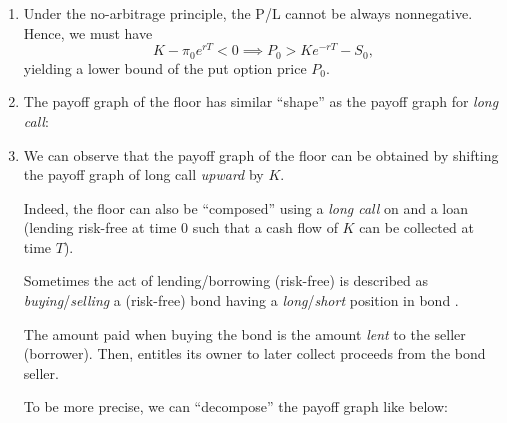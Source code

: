 \begin{enumerate}
\item \label{it:put-price-lb}
Under the no-arbitrage principle, the P/L cannot be always nonnegative. Hence,
we must have
\[
K-\pi_0 e^{rT}<0 \implies P_0>Ke^{-rT}-S_0,
\]
yielding a lower bound of the put option price \(P_0\).
\item The payoff graph of the floor has similar ``shape'' as the payoff graph
for \emph{long call}:
\begin{center}
\end{center}

\item \label{it:floor-lc-lb-payoff}
We can observe that the payoff graph of the floor can be obtained by
shifting the payoff graph of long call \emph{upward} by \(K\).

Indeed, the floor can also be ``composed'' using a \emph{long call} on
 and a loan (lending  risk-free at time
0 such that a cash flow of \(K\) can be collected at time \(T\)).

\begin{note}
Sometimes the act of lending/borrowing  (risk-free) is
described as \emph{buying}/\emph{selling} a (risk-free) bond 
 having a \emph{long}/\emph{short} position in bond
.

The amount paid when buying the bond  is the amount \emph{lent}
to the seller (borrower). Then,  entitles its owner to later
collect proceeds from the bond seller.
\end{note}

To be more precise, we can ``decompose'' the payoff graph like below:


\end{enumerate}
